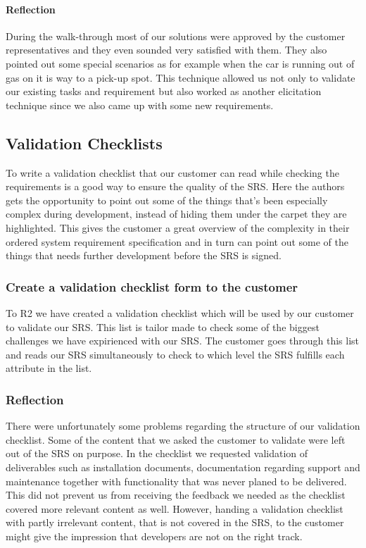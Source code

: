 \documentclass[10pt]{article}
\begin{document}
\paragraph{Reflection}
\hfill \break
During the walk-through most of our solutions were approved by the customer representatives and they even sounded very satisfied with them.
They also pointed out some special scenarios as for example when the car is running out of gas on it is way to a pick-up spot.
This technique allowed us not only to validate our existing tasks and requirement but also worked as another elicitation technique since we also came up with some new requirements.

\subsection{Validation Checklists}
To write a validation checklist that our customer can read while checking the requirements is a good way to ensure the quality of the SRS. Here the authors gets the opportunity to point out some of the things that's been especially complex during development, instead of hiding them under the carpet they are highlighted. This gives the customer a great overview of the complexity in their ordered system requirement specification and in turn can point out some of the things that needs further development before the SRS is signed.

\subsubsection{Create a validation checklist form to the customer}
To R2 we have created a validation checklist which will be used by our customer to validate our SRS. This list is tailor made to check some of the biggest challenges we have expirienced with our SRS. The customer goes through this list and reads our SRS simultaneously to check to which level the SRS fulfills each attribute in the list.

\subsubsection{Reflection}
There were unfortunately some problems regarding the structure of our validation checklist. Some of the content that we asked the customer to validate were left out of the SRS on purpose. In the checklist we requested validation of deliverables such as installation documents, documentation regarding support and maintenance together with functionality that was never planed to be delivered.
This did not prevent us from receiving the feedback we needed as the checklist covered more relevant content as well. However, handing a validation checklist with partly irrelevant content, that is not covered in the SRS, to the customer might give the impression that developers are not on the right track. 
\end{document}

